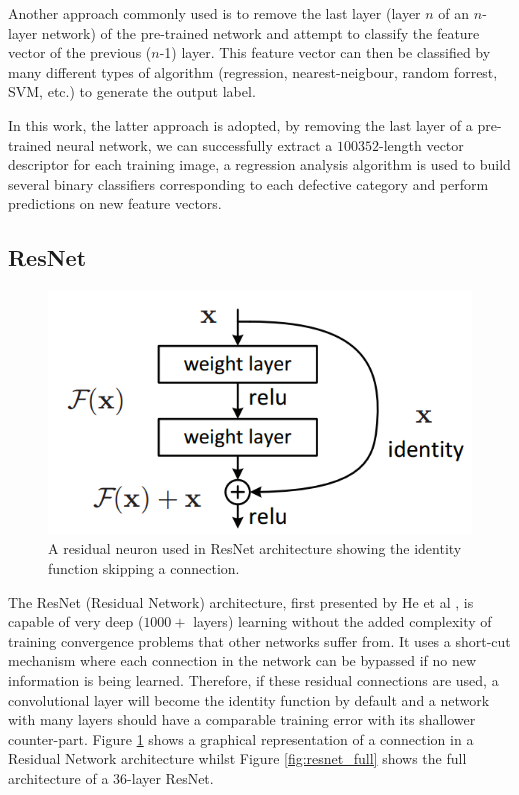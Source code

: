 \documentclass[fleqn,twoside,12pt]{report}
\begin{document}
Another approach commonly used is to remove the last layer (layer $n$ of an $n$-layer network) of the pre-trained network and attempt to classify the feature vector of the previous ($n$-1) layer. This feature vector can then be classified by many different types of algorithm (regression, nearest-neigbour, random forrest, SVM, etc.) to generate the output label.

In this work, the latter approach is adopted, by removing the last layer of a pre-trained neural network, we can successfully extract a $100352$-length vector descriptor for each training image, a regression analysis algorithm is used to build several binary classifiers corresponding to each defective category and perform predictions on new feature vectors.

\subsection{ResNet}
\label{sec:resnet}


\begin{figure}[h]
	\centering
	\includegraphics[width=0.7\linewidth]{residual_neuron.png}
	\caption{A residual neuron used in ResNet architecture showing the identity function skipping a connection.}
	\label{fig:residual}
\end{figure}

The ResNet (Residual Network) architecture, first presented by He et al \cite{he}, is capable of very deep ($1000+$ layers) learning without the added complexity of training convergence problems that other networks suffer from. It uses a short-cut mechanism where each connection in the network can be bypassed if no new information is being learned. Therefore, if these residual connections are used, a convolutional layer will become the identity function by default and a network with many layers should have a comparable training error with its shallower counter-part. Figure \ref{fig:residual} shows a graphical representation of a connection in a Residual Network architecture whilst Figure \ref{fig:resnet_full} shows the full architecture of a $36$-layer ResNet.
\end{document}
